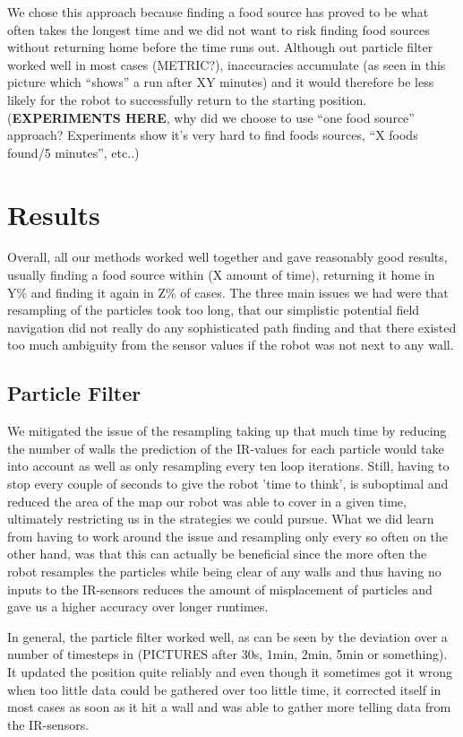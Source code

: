 \documentclass[paper=a4, fontsize=12pt]{scrartcl}	%
\numberwithin{equation}{section}		%
\numberwithin{figure}{section}			%
\numberwithin{table}{section}				%
\begin{document}
We chose this approach because finding a food source has proved to be what often takes the longest time and we did not want to risk finding food sources without returning home before the time runs out. Although out particle filter worked well in most cases (METRIC?), inaccuracies accumulate (as seen in this picture which “shows” a run after XY minutes) and it would therefore be less likely for the robot to successfully return to the starting position.
(\textbf{EXPERIMENTS HERE}, why did we choose to use “one food source” approach? Experiments show it’s very hard to find foods sources, “X foods found/5 minutes”, etc..)

\section{Results}
Overall, all our methods worked well together and gave reasonably good results, usually finding a food source within (X amount of time), returning it home in Y\% and finding it again in Z\% of cases. The three main issues we had were that resampling of the particles took too long, that our simplistic potential field navigation did not really do any sophisticated path finding and that there existed too much ambiguity from the sensor values if the robot was not next to any wall.
\subsection{Particle Filter}
We mitigated the issue of the resampling taking up that much time by reducing the number of walls the prediction of the IR-values for each particle would take into account as well as only resampling every ten loop iterations. Still, having to stop every couple of seconds to give the robot 'time to think', is suboptimal and reduced the area of the map our robot was able to cover in a given time, ultimately restricting us in the strategies we could pursue. What we did learn from having to work around the issue and resampling only every so often on the other hand, was that this can actually be beneficial since the more often the robot resamples the particles while being clear of any walls and thus having no inputs to the IR-sensors reduces the amount of misplacement of particles and gave us a higher accuracy over longer runtimes.

In general, the particle filter worked well, as can be seen by the deviation over a number of timesteps in (PICTURES after 30s, 1min, 2min, 5min or something). It updated the position quite reliably and even though it sometimes got it wrong when too little data could be gathered over too little time, it corrected itself in most cases as soon as it hit a wall and was able to gather more telling data from the IR-sensors.
\end{document}
